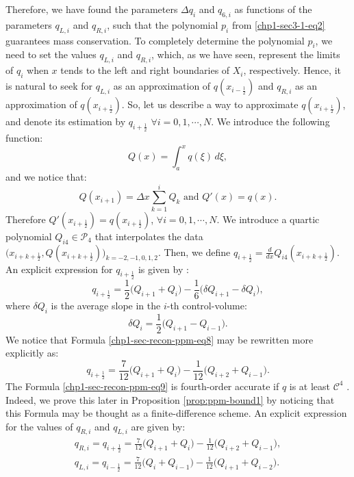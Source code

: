 Therefore, we have found the parameters $\Delta q_i$ and $q_{6, i}$ as
functions of the parameters $q_{L, i}$ and $q_{R, i}$,
such that the polynomial $p_i$ from \eqref{chp1-sec3-1-eq2} 
guarantees mass conservation. To completely determine the 
polynomial $p_i$, we need to set the values $q_{L, i}$ and
$q_{R, i}$, which, as we have seen, represent the limits of $q_i$ when
$x$ tends to the left and right boundaries of $X_i$, respectively.
Hence, it is natural to seek for $q_{L, i}$ as an approximation of $q(x_{i-\frac{1}{2}})$
and $q_{R, i}$ as an approximation of $q(x_{i+\frac{1}{2}})$.
So, let us describe a way to approximate $q(x_{i+\frac{1}{2}})$, and denote its estimation by
$q_{i+\frac{1}{2}}$ $\forall i = 0, 1, \cdots, N$.
We introduce the following function:
\begin{equation}
	\label{chp1-sec-recon-ppm-eq5}
	Q(x) = \int_{a}^{x} q(\xi) \,d\xi,
\end{equation}
and we notice that:
\begin{equation}
	\label{chp1-sec-recon-ppm-eq6}
	Q(x_{i+1}) = \Delta x \sum_{k=1}^{i} Q_k \text{ and } Q'(x) = q(x).
\end{equation}
Therefore $Q'(x_{i+\frac{1}{2}}) = q(x_{i+\frac{1}{2}}) $, $\forall i = 0, 1, \cdots, N$.
We introduce a quartic polynomial $Q_{i4} \in \mathcal{P}_4$ that interpolates the data
$\big(x_{i+k+\frac{1}{2}}, Q(x_{i+k+\frac{1}{2}})\big)_{k=-2,-1,0,1,2}$. Then, we define
$q_{i+\frac{1}{2}} = \frac{d}{dx}Q_{i4}(x_{i+k+\frac{1}{2}})$.
An explicit expression for $q_{i+\frac{1}{2}}$ is given by \citep{colella:1984}:
\begin{equation}
	\label{chp1-sec-recon-ppm-eq7}
	q_{i+\frac{1}{2}} = \frac{1}{2} \bigg( Q_{i+1} + Q_{i} \bigg) - \frac{1}{6} \bigg( \delta Q_{i+1} - \delta Q_{i}\bigg),
\end{equation}
where $\delta Q_{i}$ is the average slope in the $i$-th control-volume:
\begin{equation}
	\label{chp1-sec-recon-ppm-eq8}
	\delta Q_{i} = \frac{1}{2} \bigg( Q_{i+1} - Q_{i-1} \bigg).
\end{equation}
We notice that Formula \eqref{chp1-sec-recon-ppm-eq8} may be rewritten more explicitly as:
\begin{equation}
	\label{chp1-sec-recon-ppm-eq9}
	q_{i+\frac{1}{2}} = \frac{7}{12} \bigg( Q_{i+1} + Q_{i} \bigg) - \frac{1}{12} \bigg(  Q_{i+2} +Q_{i-1}\bigg).
\end{equation}
The Formula \eqref{chp1-sec-recon-ppm-eq9} is fourth-order accurate if
$q$ is at least $\mathcal{C}^4$ \citep{colella:1984}. Indeed, we
prove this later in Proposition \ref{prop:ppm-bound1} by noticing
that this Formula may be thought as a finite-difference scheme. 
An explicit expression for the values of $q_{R,i}$ and $q_{L,i}$ are given by:
\begin{align}
	\label{chp1-sec-recon-ppm-eq10}
	q_{R,i} = q_{i+\frac{1}{2}} = \frac{7}{12} \bigg( Q_{i+1} + Q_{i} \bigg) - \frac{1}{12} \bigg(  Q_{i+2} +Q_{i-1}\bigg), \\
	\label{chp1-sec-recon-ppm-eq11}
	q_{L,i} = q_{i-\frac{1}{2}} = \frac{7}{12} \bigg( Q_{i} + Q_{i-1} \bigg) - \frac{1}{12} \bigg(  Q_{i+1} +Q_{i-2}\bigg).
\end{align}

